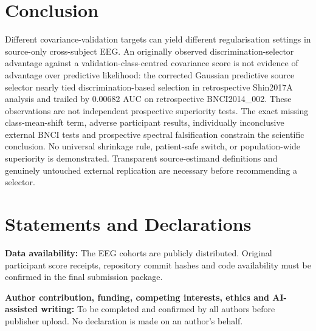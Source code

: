 \documentclass[11pt,a4paper]{article}
\begin{document}






\section{Conclusion}
Different covariance-validation targets can yield different
regularisation settings in source-only cross-subject EEG. An originally observed
discrimination-selector advantage against a validation-class-centred
covariance score is not evidence of advantage over predictive
likelihood: the corrected Gaussian predictive source selector
nearly tied discrimination-based selection in retrospective
Shin2017A analysis and trailed by 0.00682 AUC on
retrospective BNCI2014\_002. These observations are
not independent prospective superiority tests. The exact missing class-mean-shift term, adverse
participant results, individually inconclusive external BNCI
tests and prospective spectral falsification constrain the
scientific conclusion. No universal shrinkage rule, patient-safe
switch, or population-wide superiority is demonstrated.
Transparent source-estimand definitions and genuinely untouched
external replication are necessary before recommending a selector.

\section*{Statements and Declarations}
\textbf{Data availability:} The EEG cohorts are publicly distributed.
Original participant score receipts, repository commit hashes and code
availability must be confirmed in the final submission package.

\textbf{Author contribution, funding, competing interests, ethics and
AI-assisted writing:} To be completed and confirmed by all authors before
publisher upload. No declaration is made on an author's behalf.



\end{document}
